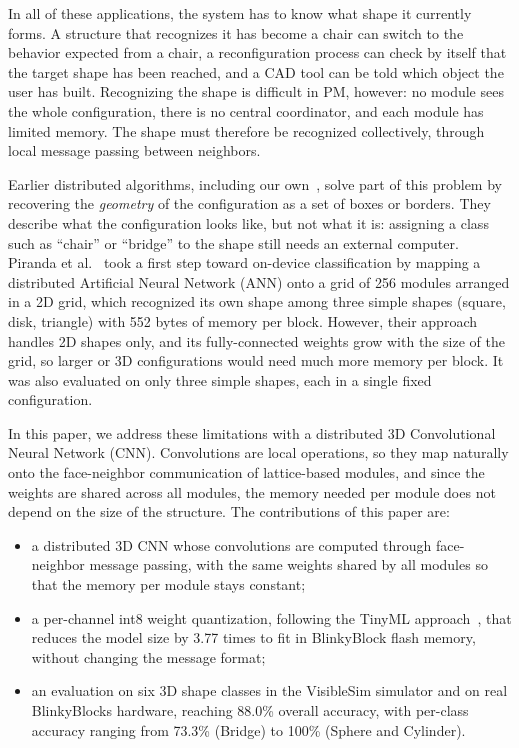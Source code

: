 \documentclass[12pt]{article}
\begin{document}
In all of these applications, the system has to know what shape it currently forms. A structure that recognizes it has become a chair can switch to the behavior expected from a chair, a reconfiguration process can check by itself that the target shape has been reached, and a CAD tool can be told which object the user has built. Recognizing the shape is difficult in PM, however: no module sees the whole configuration, there is no central coordinator, and each module has limited memory. The shape must therefore be recognized collectively, through local message passing between neighbors.

Earlier distributed algorithms, including our own~\cite{bassil2023shape,bassil2025configuration,bassil2026borderwalk}, solve part of this problem by recovering the \emph{geometry} of the configuration as a set of boxes or borders. They describe what the configuration looks like, but not what it is: assigning a class such as ``chair'' or ``bridge'' to the shape still needs an external computer. Piranda et al.~\cite{piranda2024ai4pm} took a first step toward on-device classification by mapping a distributed Artificial Neural Network (ANN) onto a grid of 256 modules arranged in a 2D grid, which recognized its own shape among three simple shapes (square, disk, triangle) with 552 bytes of memory per block. However, their approach handles 2D shapes only, and its fully-connected weights grow with the size of the grid, so larger or 3D configurations would need much more memory per block. It was also evaluated on only three simple shapes, each in a single fixed configuration.

In this paper, we address these limitations with a distributed 3D Convolutional Neural Network (CNN). Convolutions are local operations, so they map naturally onto the face-neighbor communication of lattice-based modules, and since the weights are shared across all modules, the memory needed per module does not depend on the size of the structure. The contributions of this paper are:
\begin{itemize}
  \item a distributed 3D CNN whose convolutions are computed through face-neighbor message passing, with the same weights shared by all modules so that the memory per module stays constant;
  \item a per-channel int8 weight quantization, following the TinyML approach~\cite{capogrosso}, that reduces the model size by 3.77 times to fit in BlinkyBlock flash memory, without changing the message format;
  \item an evaluation on six 3D shape classes in the VisibleSim simulator and on real BlinkyBlocks hardware, reaching 88.0\% overall accuracy, with per-class accuracy ranging from 73.3\% (Bridge) to 100\% (Sphere and Cylinder).
\end{itemize}
\end{document}
